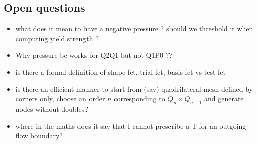 \subsection{Open questions}

\begin{itemize}
\item what does it mean to have a negative pressure ? should we threshold it when computing yield strength ? 
\item Why pressure bc works for Q2Q1 but not Q1P0 ??
\item is there a formal definition of shape fct, trial fct, basis fct vs test fct 
\item is there an efficient manner to start from (say) quadrilateral mesh defined by corners only, choose an 
order $n$ corresponding to $Q_n \times Q_{n-1}$ and generate nodes without doubles?
\item where in the maths does it say that I cannot prescribe a T for an outgoing flow boundary?
\end{itemize}





